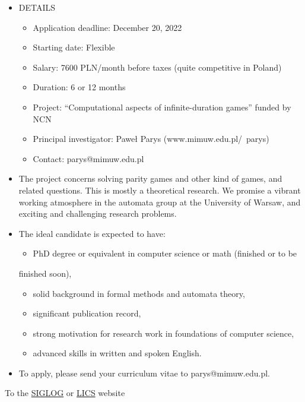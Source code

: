 \documentclass[prodmode,acmtecs]{acmsmall} %
\begin{document}
\begin{itemize}\item  DETAILS 
 
\begin{itemize}\item  Application deadline: December 20, 2022
\item  Starting date: Flexible
\item  Salary: 7600 PLN/month before taxes (quite competitive in Poland)
\item  Duration: 6 or 12 months
\item  Project: ``Computational aspects of infinite-duration games'' funded by NCN
\item  Principal investigator: Paweł Parys (www.mimuw.edu.pl/~parys)
\item  Contact: parys@mimuw.edu.pl
\end{itemize} 
\item  The project concerns solving parity games and other kind of games, and related questions. This is mostly a theoretical research. We promise a vibrant working atmosphere in the automata group at the University of Warsaw, and exciting and challenging research problems. 
 
\item  The ideal candidate is expected to have: 
 
\begin{itemize}\item  PhD degree or equivalent in computer science or math (finished or to be
\end{itemize} 
  finished soon), 
 
\begin{itemize}\item  solid background in formal methods and automata theory,
\item  significant publication record,
\item  strong motivation for research work in foundations of computer science,
\item  advanced skills in written and spoken English.
\end{itemize} 
\item  To apply, please send your curriculum vitae to parys@mimuw.edu.pl. 
 
\end{itemize}


To the \href{http://siglog.org/}{SIGLOG} or \href{https://lics.siglog.org}{LICS} website
\end{document}
